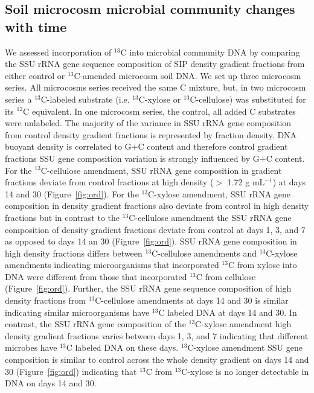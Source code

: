 \subsection{Soil microcosm microbial community changes with time}
We assessed incorporation of $^{13}$C into microbial community DNA by comparing the
SSU rRNA gene sequence composition of SIP density gradient fractions from
either control or $^{13}$C-amended microcosm soil DNA. We set up three microcosm
series. All microcosms series received the same C mixture, but, in two
microcosm series a $^{13}$C-labeled substrate (i.e. $^{13}$C-xylose or
$^{13}$C-cellulose) was substituted for its $^{12}$C equivalent. In one
microcosm series, the control, all added C substrates were unlabeled. The
majority of the variance in SSU rRNA gene composition from control density
gradient fractions is represented by fraction density. DNA buoyant density is
correlated to G$+$C content \citep{Buckley_2007} and therefore control gradient
fractions SSU gene composition variation is strongly influenced by G$+$C
content. For the $^{13}$C-cellulose amendment, SSU rRNA gene composition in
gradient fractions deviate from control fractions at high density ($>$ 1.72
g mL$^{-1}$) at days 14 and 30 (Figure~\ref{fig:ord}). For the $^{13}$C-xylose
amendment, SSU rRNA gene composition in density gradient fractions also deviate
from control in high density fractions but in contrast to the
$^{13}$C-cellulose amendment the SSU rRNA gene composition of density gradient
fractions deviate from control at days 1, 3, and 7 as opposed to days 14 an 30
(Figure~\ref{fig:ord}). SSU rRNA gene composition in high density fractions
differs between $^{13}$C-cellulose amendments and $^{13}$C-xylose amendments
indicating microorganisms that incorporated $^{13}$C from xylose into DNA were
different from those that incorporated $^{13}$C from cellulose
(Figure~\ref{fig:ord}). Further, the SSU rRNA gene sequence composition of high
density fractions from $^{13}$C-cellulose amendments at days 14 and 30 is
similar indicating similar microorganisms have $^{13}$C labeled DNA at days 14
and 30. In contrast, the SSU rRNA gene composition of the $^{13}$C-xylose
amendment high density gradient fractions varies between days 1, 3, and
7 indicating that different microbes have $^{13}$C labeled DNA on these days.
$^{13}$C-xylose amendment SSU gene composition is similar to control across the
whole density gradient on days 14 and 30 (Figure~\ref{fig:ord}) indicating that
$^{13}$C from $^{13}$C-xylose is no longer detectable in DNA on days 14 and 30. 

